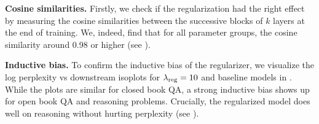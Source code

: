 {\bf Cosine similarities.} Firstly, we check if the regularization had the right effect by measuring the cosine similarities between the successive blocks of $k$ layers at the end of training.  We, indeed, find that for all parameter groups, the cosine similarity around 0.98 or higher (see ). 



\iffalse
{\bf Results.} \Cref{table:regularization_results} summarizes the results with regularization. Overall, we find that regularized models improve over standard training. In particular, for block size of $k=4$, we find that higher regularization strength of $\lreg=10$ was more effective than $\lreg=1$. Thus, we use $\lreg=10$ for all other experiments. Not only does regularization slightly improve perplexity ($7.40 \rightarrow 7.38$) and closed book QA performance ($11.2 \rightarrow 12.5$), it significantly improves open book QA ($33.9 \rightarrow 36.2$), math word problems ($29.3 \rightarrow 36.4$) and reasoning primitives ($47.5 \rightarrow 57.5$). Thus, we are able to achieve the best of both worlds -- better memorization than baseline and better reasoning than looped models.
\fi

{\bf Inductive bias.} To confirm the inductive bias of the regularizer, we visualize the log perplexity vs downstream isoplots for $\lreg=10$ and baseline models in . While the plots are similar for closed book QA, a strong inductive bias shows up for open book QA and reasoning problems.
Crucially, the regularized model does well on reasoning without hurting perplexity (see ).




